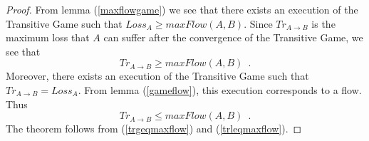 \begin{proof}%
  From lemma (\ref{maxflowgame}) we see that there exists an execution of the Transitive Game such that
  $Loss_A \geq maxFlow\left(A, B\right)$.
  Since $Tr_{A \rightarrow B}$ is the maximum loss that $A$ can suffer after the convergence of the Transitive Game, we
  see that
  \begin{equation}
  \label{trgeqmaxflow}
    Tr_{A \rightarrow B} \geq maxFlow\left(A, B\right) \enspace.
  \end{equation}
  Moreover, there exists an execution of the Transitive Game such that $Tr_{A \rightarrow B} = Loss_A$.
  From lemma (\ref{gameflow}), this execution corresponds to a flow. Thus
  \begin{equation}
  \label{trleqmaxflow}
    Tr_{A \rightarrow B} \leq maxFlow\left(A, B\right) \enspace.
  \end{equation}
  The theorem follows from (\ref{trgeqmaxflow}) and (\ref{trleqmaxflow}).
\end{proof}
